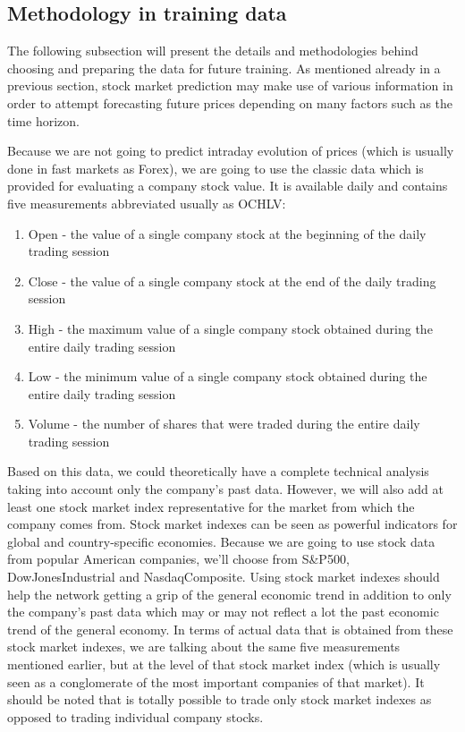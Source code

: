\subsection{Methodology in training data}
The following subsection will present the details and methodologies behind choosing and preparing the data for future training. As mentioned already in a previous section, stock market prediction may make use of various information in order to attempt forecasting future prices depending on many factors such as the time horizon.

Because we are not going to predict intraday evolution of prices (which is usually done in fast markets as Forex), we are going to use the classic data which is provided for evaluating a company stock value. It is available daily and contains five measurements abbreviated usually as OCHLV:
\begin{enumerate}
    \item Open - the value of a single company stock at the beginning of the daily trading session
    \item Close - the value of a single company stock at the end of the daily trading session
    \item High - the maximum value of a single company stock obtained during the entire daily trading session
    \item Low - the minimum value of a single company stock obtained during the entire daily trading session
    \item Volume - the number of shares that were traded during the entire daily trading session
\end{enumerate}
Based on this data, we could theoretically have a complete technical analysis taking into account only the company's past data. However, we will also add at least one stock market index representative for the market from which the company comes from. Stock market indexes can be seen as powerful indicators for global and country-specific economies. Because we are going to use stock data from popular American companies, we'll choose from S\&P500, DowJonesIndustrial and NasdaqComposite. Using stock market indexes should help the network getting a grip of the general economic trend in addition to only the company's past data which may or may not reflect a lot the past economic trend of the general economy. In terms of actual data that is obtained from these stock market indexes, we are talking about the same five measurements mentioned earlier, but at the level of that stock market index (which is usually seen as a conglomerate of the most important companies of that market). It should be noted that is totally possible to trade only stock market indexes as opposed to trading individual company stocks.

